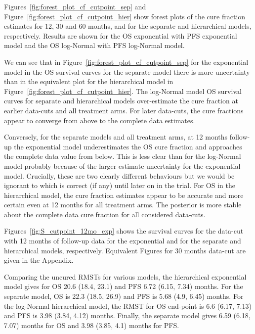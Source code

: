 \documentclass[AMA,STIX1COL]{WileyNJD-v2}
\begin{document}
Figures~\ref{fig:forest_plot_cf_cutpoint_sep} and Figure~\ref{fig:forest_plot_cf_cutpoint_hier} show forest plots of the cure fraction estimates for 12, 30 and 60 months, and for the separate and hierarchical models, respectively.
Results are shown for the OS exponential with PFS exponential model and the OS log-Normal with PFS log-Normal model.

We can see that in Figure~\ref{fig:forest_plot_cf_cutpoint_sep} for the exponential model in the OS survival curves for the separate model there is more uncertainty than in the equivalent plot for the hierarchical model in Figure~\ref{fig:forest_plot_cf_cutpoint_hier}.
The log-Normal model OS survival curves for separate and hierarchical models over-estimate the cure fraction at earlier data-cuts and all treatment arms.
For later data-cuts, the cure fractions appear to converge from above to the complete data estimates.

Conversely, for the separate models and all treatment arms, at 12 months follow-up the exponential model underestimates the OS cure fraction and approaches the complete data value from below.
This is less clear than for the log-Normal model probably because of the larger estimate uncertainty for the exponential model.
Crucially, these are two clearly different behaviours but we would be ignorant to which is correct (if any) until later on in the trial.
For OS in the hierarchical model, the cure fraction estimates appear to be accurate and more certain even at 12 months for all treatment arms.
The posterior is more stable about the complete data cure fraction for all considered data-cuts.


Figures~\ref{fig:S_cutpoint_12mo_exp} shows the survival curves for the data-cut with 12 months of follow-up data for the exponential and for the separate and hierarchical models, respectively.
Equivalent Figures for 30 months data-cut are given in the Appendix.

Comparing the uncured RMSTs for various models,
the hierarchical exponential model gives for OS 20.6 (18.4, 23.1) and PFS 6.72 (6.15, 7.34) months.
For the separate model, OS is 22.3 (18.5, 26.9) and PFS is 5.68 (4.9, 6.45) months.
For the log-Normal hierarchical model, the RMST for OS end-point is 6.6 (6.17, 7.13) and PFS is 3.98 (3.84, 4.12) months.
Finally, the separate model gives 6.59 (6.18, 7.07) months for OS and 3.98 (3.85, 4.1) months for PFS.
\end{document}
